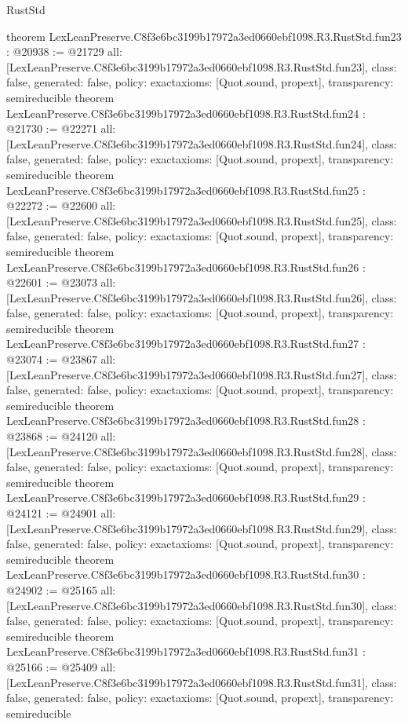 \begin{lexlean}{RustStd}
\begin{coremodule}
{}
theorem LexLeanPreserve.C8f3e6bc3199b17972a3ed0660ebf1098.R3.RustStd.fun23 : @20938 := @21729 {
  all: [LexLeanPreserve.C8f3e6bc3199b17972a3ed0660ebf1098.R3.RustStd.fun23],
  class: false,
  generated: false,
  policy: exact{axioms: [Quot.sound, propext]},
  transparency: semireducible
}
theorem LexLeanPreserve.C8f3e6bc3199b17972a3ed0660ebf1098.R3.RustStd.fun24 : @21730 := @22271 {
  all: [LexLeanPreserve.C8f3e6bc3199b17972a3ed0660ebf1098.R3.RustStd.fun24],
  class: false,
  generated: false,
  policy: exact{axioms: [Quot.sound, propext]},
  transparency: semireducible
}
theorem LexLeanPreserve.C8f3e6bc3199b17972a3ed0660ebf1098.R3.RustStd.fun25 : @22272 := @22600 {
  all: [LexLeanPreserve.C8f3e6bc3199b17972a3ed0660ebf1098.R3.RustStd.fun25],
  class: false,
  generated: false,
  policy: exact{axioms: [Quot.sound, propext]},
  transparency: semireducible
}
theorem LexLeanPreserve.C8f3e6bc3199b17972a3ed0660ebf1098.R3.RustStd.fun26 : @22601 := @23073 {
  all: [LexLeanPreserve.C8f3e6bc3199b17972a3ed0660ebf1098.R3.RustStd.fun26],
  class: false,
  generated: false,
  policy: exact{axioms: [Quot.sound, propext]},
  transparency: semireducible
}
theorem LexLeanPreserve.C8f3e6bc3199b17972a3ed0660ebf1098.R3.RustStd.fun27 : @23074 := @23867 {
  all: [LexLeanPreserve.C8f3e6bc3199b17972a3ed0660ebf1098.R3.RustStd.fun27],
  class: false,
  generated: false,
  policy: exact{axioms: [Quot.sound, propext]},
  transparency: semireducible
}
theorem LexLeanPreserve.C8f3e6bc3199b17972a3ed0660ebf1098.R3.RustStd.fun28 : @23868 := @24120 {
  all: [LexLeanPreserve.C8f3e6bc3199b17972a3ed0660ebf1098.R3.RustStd.fun28],
  class: false,
  generated: false,
  policy: exact{axioms: [Quot.sound, propext]},
  transparency: semireducible
}
theorem LexLeanPreserve.C8f3e6bc3199b17972a3ed0660ebf1098.R3.RustStd.fun29 : @24121 := @24901 {
  all: [LexLeanPreserve.C8f3e6bc3199b17972a3ed0660ebf1098.R3.RustStd.fun29],
  class: false,
  generated: false,
  policy: exact{axioms: [Quot.sound, propext]},
  transparency: semireducible
}
theorem LexLeanPreserve.C8f3e6bc3199b17972a3ed0660ebf1098.R3.RustStd.fun30 : @24902 := @25165 {
  all: [LexLeanPreserve.C8f3e6bc3199b17972a3ed0660ebf1098.R3.RustStd.fun30],
  class: false,
  generated: false,
  policy: exact{axioms: [Quot.sound, propext]},
  transparency: semireducible
}
theorem LexLeanPreserve.C8f3e6bc3199b17972a3ed0660ebf1098.R3.RustStd.fun31 : @25166 := @25409 {
  all: [LexLeanPreserve.C8f3e6bc3199b17972a3ed0660ebf1098.R3.RustStd.fun31],
  class: false,
  generated: false,
  policy: exact{axioms: [Quot.sound, propext]},
  transparency: semireducible
}
\end{coremodule}
\end{lexlean}
